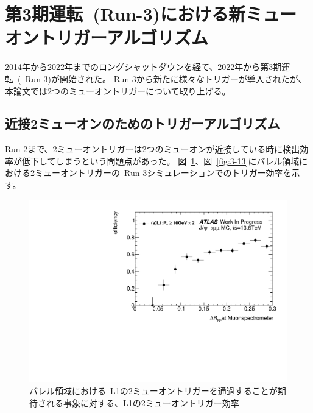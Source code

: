 \section{第3期運転~(Run-3)における新ミューオントリガーアルゴリズム}\label{chapter3-3}
2014年から2022年までのロングシャットダウンを経て、2022年から第3期運転~(~Run-3)が開始された。
Run-3から新たに様々なトリガーが導入されたが、本論文では2つのミューオントリガーについて取り上げる。

\subsection{近接2ミューオンのためのトリガーアルゴリズム}\label{chapter3-3-1}
Run-2まで、2ミューオントリガーは2つのミューオンが近接している時に検出効率が低下してしまうという問題点があった。
図~\ref{fig:3-12}、図~\ref{fig:3-13}にバレル領域における2ミューオントリガーの~Run-3シミュレーションでのトリガー効率を示す。

\begin{figure}[H]
    \centering
    \includegraphics[clip, width=13cm]{fig/3/2MU10_MC_eff.pdf}
    \caption{バレル領域における~L1の2ミューオントリガーを通過することが期待される事象に対する、L1の2ミューオントリガー効率}
    \label{fig:3-12}
\end{figure}


